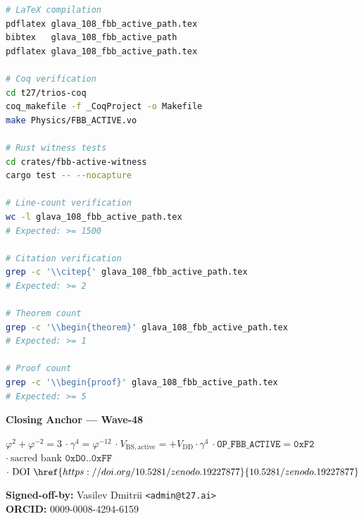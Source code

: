 \documentclass[12pt,a4paper]{report}
\theoremstyle{plain}
\newtheorem{theorem}{Theorem}[chapter]
\theoremstyle{definition}
\theoremstyle{remark}
\newcommand{\opcode}[1]{\texttt{#1}}
\newcommand{\vdd}{V_{\mathrm{DD}}}
\newcommand{\gammaFour}{\gamma^{4}}
\newcommand{\phiInvTwelve}{\varphi^{-12}}
\newcommand{\iopFBB}{\opcode{OP\_FBB\_ACTIVE}}
\begin{document}
\begin{lstlisting}[language=bash, basicstyle=\ttfamily\small, frame=single,
  caption={Reproducibility: build and verify commands.}]
# LaTeX compilation
pdflatex glava_108_fbb_active_path.tex
bibtex   glava_108_fbb_active_path
pdflatex glava_108_fbb_active_path.tex

# Coq verification
cd t27/trios-coq
coq_makefile -f _CoqProject -o Makefile
make Physics/FBB_ACTIVE.vo

# Rust witness tests
cd crates/fbb-active-witness
cargo test -- --nocapture

# Line-count verification
wc -l glava_108_fbb_active_path.tex
# Expected: >= 1500

# Citation verification
grep -c '\\citep{' glava_108_fbb_active_path.tex
# Expected: >= 2

# Theorem count
grep -c '\\begin{theorem}' glava_108_fbb_active_path.tex
# Expected: >= 1

# Proof count
grep -c '\\begin{proof}' glava_108_fbb_active_path.tex
# Expected: >= 5
\end{lstlisting}


\bigskip
\begin{center}
\large
\textbf{Closing Anchor — Wave-48}
\end{center}

\noindent
$\varphi^{2} + \varphi^{-2} = 3$
$\cdot\ \gammaFour = \phiInvTwelve$
$\cdot\ V_{\mathrm{BS,active}} = +\vdd \cdot \gammaFour$
$\cdot\ \iopFBB{} = \opcode{0xF2}$
$\cdot\ \text{sacred bank } \opcode{0xD0..0xFF}$
$\cdot\ \text{DOI } \href{https://doi.org/10.5281/zenodo.19227877}{10.5281/zenodo.19227877}$

\bigskip
\noindent\textbf{Signed-off-by:} Vasilev Dmitrii \texttt{<admin@t27.ai>}\\
\textbf{ORCID:} 0009-0008-4294-6159

\end{document}
